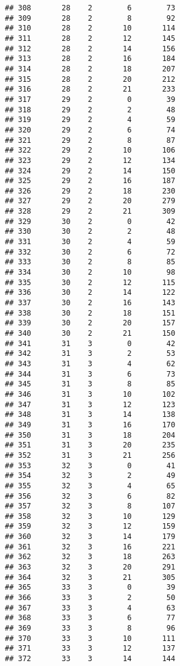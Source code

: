 \documentclass[
]{article}
\begin{document}
\begin{verbatim}
## 308       28    2        6        73
## 309       28    2        8        92
## 310       28    2       10       114
## 311       28    2       12       145
## 312       28    2       14       156
## 313       28    2       16       184
## 314       28    2       18       207
## 315       28    2       20       212
## 316       28    2       21       233
## 317       29    2        0        39
## 318       29    2        2        48
## 319       29    2        4        59
## 320       29    2        6        74
## 321       29    2        8        87
## 322       29    2       10       106
## 323       29    2       12       134
## 324       29    2       14       150
## 325       29    2       16       187
## 326       29    2       18       230
## 327       29    2       20       279
## 328       29    2       21       309
## 329       30    2        0        42
## 330       30    2        2        48
## 331       30    2        4        59
## 332       30    2        6        72
## 333       30    2        8        85
## 334       30    2       10        98
## 335       30    2       12       115
## 336       30    2       14       122
## 337       30    2       16       143
## 338       30    2       18       151
## 339       30    2       20       157
## 340       30    2       21       150
## 341       31    3        0        42
## 342       31    3        2        53
## 343       31    3        4        62
## 344       31    3        6        73
## 345       31    3        8        85
## 346       31    3       10       102
## 347       31    3       12       123
## 348       31    3       14       138
## 349       31    3       16       170
## 350       31    3       18       204
## 351       31    3       20       235
## 352       31    3       21       256
## 353       32    3        0        41
## 354       32    3        2        49
## 355       32    3        4        65
## 356       32    3        6        82
## 357       32    3        8       107
## 358       32    3       10       129
## 359       32    3       12       159
## 360       32    3       14       179
## 361       32    3       16       221
## 362       32    3       18       263
## 363       32    3       20       291
## 364       32    3       21       305
## 365       33    3        0        39
## 366       33    3        2        50
## 367       33    3        4        63
## 368       33    3        6        77
## 369       33    3        8        96
## 370       33    3       10       111
## 371       33    3       12       137
## 372       33    3       14       144

\end{verbatim}
\end{document}
